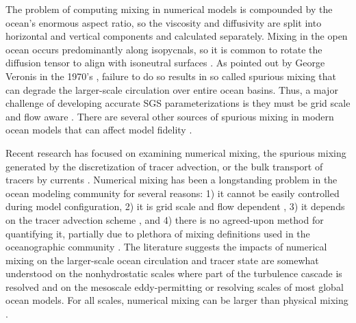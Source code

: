 The problem of computing mixing in numerical models is compounded by the ocean's enormous aspect ratio, so the viscosity and diffusivity are split into horizontal and vertical components and calculated separately. Mixing in the open ocean occurs predominantly along isopycnals, so it is common to rotate the diffusion tensor to align with isoneutral surfaces \citep{redi1982oceanic}. As pointed out by George Veronis in the 1970's \citep{veronis1975role}, failure to do so results in so called spurious mixing that can degrade the larger-scale circulation over entire ocean basins. Thus, a major challenge of developing accurate SGS parameterizations is they must be grid scale and flow aware \citep{fox2019challenges}. There are several other sources of spurious mixing in modern ocean models that can affect model fidelity \citep{megann2022assessment, Schlichting23}.  

Recent research has focused on examining numerical mixing, the spurious mixing generated by the discretization of tracer advection, or the bulk transport of tracers by currents \citep{Griffies_2000, Burchard_2008}. Numerical mixing has been a longstanding problem in the ocean modeling community for several reasons: 1) it cannot be easily controlled during model configuration, 2) it is grid scale and flow dependent \citep{Burchard_2008}, 3) it depends on the tracer advection scheme \citep{fofonova2021plume, Kalra_2019}, and 4) there is no agreed-upon method for quantifying it, partially due to plethora of mixing definitions used in the oceanographic community \citep{Klingbeil_2014, MacCready_2018, winters1995available}. The literature suggests the impacts of numerical mixing on the larger-scale ocean circulation and tracer state are somewhat understood on the nonhydrostatic scales where part of the turbulence cascade is resolved \citep[e.g., large eddy simulations, ][]{domaradzki2003effective, thornber2007implicit} and on the mesoscale eddy-permitting or resolving scales of most global ocean models. For all scales, numerical mixing can be larger than physical mixing \citep{Griffies_2000, Wang_2021}. 

